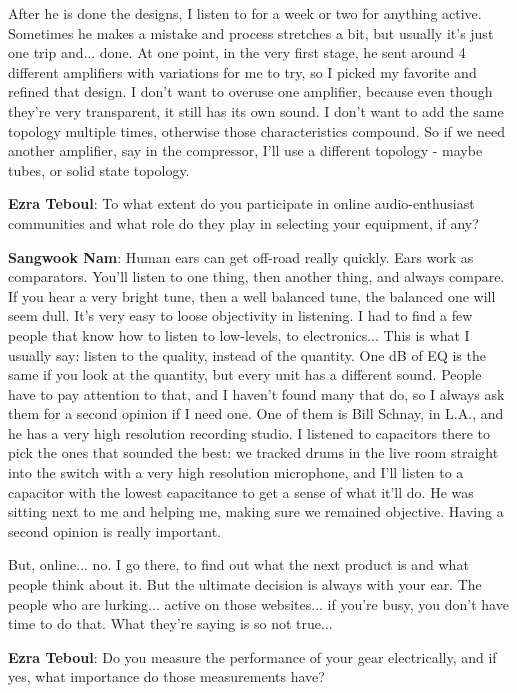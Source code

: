 After he is done the designs, I listen to for a week or two for anything active. Sometimes he makes a mistake and process stretches a bit, but usually it's just one trip and... done.
At one point, in the very first stage, he sent around 4 different amplifiers with variations for me to try, so I picked my favorite and refined that design. I don't want to overuse one amplifier, because even though they're very transparent, it still has its own sound. I don't want to add the same topology multiple times, otherwise those characteristics compound. So if we need another amplifier, say in the compressor, I'll use a different topology - maybe tubes, or solid state topology.

\textbf{Ezra Teboul}: To what extent do you participate in online audio-enthusiast communities and what role do they play in selecting your equipment, if any?

\textbf{Sangwook Nam}: Human ears can get off-road really quickly. Ears work as comparators. You'll listen to one thing, then another thing, and always compare. If you hear a very bright tune, then a well balanced tune, the balanced one will seem dull. It's very easy to loose objectivity in listening. I had to find a few people that know how to listen to low-levels, to electronics... This is what I usually say: listen to the quality, instead of the quantity. One dB of EQ is the same if you look at the quantity, but every unit has a different sound. People have to pay attention to that, and I haven't found many that do, so I always ask them for a second opinion if I need one. One of them is Bill Schnay, in L.A., and he has a very high resolution recording studio. I listened to capacitors there to pick the ones that sounded the best: we tracked drums in the live room straight into the switch with a very high resolution microphone, and I'll listen to a capacitor with the lowest capacitance to get a sense of what it'll do. He was sitting next to me and helping me, making sure we remained objective. Having a second opinion is really important.

But, online... no. I go there, to find out what the next product is and what people think about it. But the ultimate decision is always with your ear. The people who are lurking... active on those websites... if you're busy, you don't have time to do that. What they're saying is so not true...

\textbf{Ezra Teboul}: Do you measure the performance of your gear electrically, and if yes, what importance do those measurements have?

